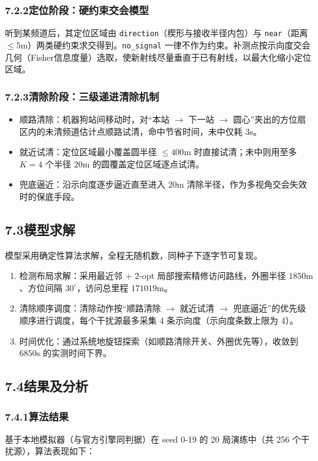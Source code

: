 \documentclass[UTF8, zihao=5,AutoFakeBold=2]{ctexart}
\begin{document}
\subsubsection*{7.2.2定位阶段：硬约束交会模型}
听到某频道后，其定位区域由 \texttt{direction}（楔形与接收半径内包）与 \texttt{near}（距离 $\le 5\text{m}$）两类硬约束求交得到。\texttt{no\_signal} 一律不作为约束。补测点按示向度交会几何（Fisher信息度量）选取，使新射线尽量垂直于已有射线，以最大化缩小定位区域。

\subsubsection*{7.2.3清除阶段：三级递进清除机制}
\begin{itemize}
    \item 顺路清除：机器狗站间移动时，对“本站 $\to$ 下一站 $\to$ 圆心”夹出的方位扇区内的未清频道估计点顺路试清，命中节省时间，未中仅耗 $3\text{s}$。
    \item 就近试清：定位区域最小覆盖圆半径 $\le 400\text{m}$ 时直接试清；未中则用至多 $K=4$ 个半径 $20\text{m}$ 的圆覆盖定位区域逐点试清。
    \item 兜底逼近：沿示向度逐步逼近直至进入 $20\text{m}$ 清除半径，作为多视角交会失效时的保底手段。
\end{itemize}

	\subsection*{7.3模型求解}
	模型采用确定性算法求解，全程无随机数，同种子下逐字节可复现。
\begin{enumerate}
    \item 检测布局求解：采用最近邻 + 2-opt 局部搜索精修访问路线，外圈半径 $1850\text{m}$、方位间隔 $30^{\circ}$，访问总里程 $171019\text{m}$。
    \item 清除顺序调度：清除动作按“顺路清除 $\to$ 就近试清 $\to$ 兜底逼近”的优先级顺序进行调度，每个干扰源最多采集 4 条示向度（示向度条数上限为 4）。
    \item 时间优化：通过系统地旋钮探索（如顺路清除开关、外圈优先等），收敛到 $6850\text{s}$ 的实测时间下界。
\end{enumerate}
	\subsection*{7.4结果及分析}
	\subsubsection*{7.4.1算法结果}
基于本地模拟器（与官方引擎同判据）在 seed 0-19 的 20 局演练中（共 256 个干扰源），算法表现如下：
\end{document}
